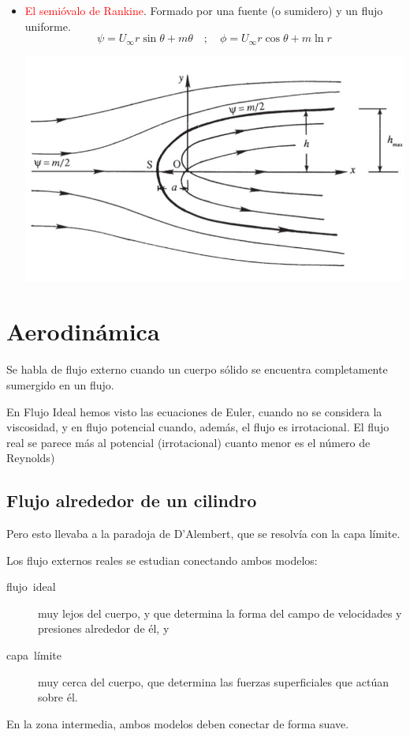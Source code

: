 \begin{itemize}
	
	 \item \textcolor{red}{El semióvalo de Rankine}. Formado por una fuente (o
	sumidero) y un flujo uniforme. 
	\[
	\psi=U_{\infty}r\sin\theta+m\theta\quad;\quad\phi=U_{\infty}r\cos\theta+m\ln r
	\]
	
\begin{center}
	\includegraphics[width=0.7\linewidth]{TeX_files/chapter09-Externo/rankine}
\end{center}

\end{itemize}

\section{Aerodinámica}

	
	Se habla de flujo externo cuando un cuerpo sólido se encuentra completamente
	sumergido en un flujo.
	
	En Flujo Ideal hemos visto las ecuaciones de Euler, cuando no se considera
	la viscosidad, y en flujo potencial cuando, además, el flujo es irrotacional.
	El flujo real se parece más al potencial (irrotacional) cuanto menor
	es el número de Reynolds)
\subsection{Flujo alrededor de un cilindro}
	
	\begin{center}
	\end{center}
	

	
	Pero esto llevaba a la paradoja de D'Alembert, que se resolvía con
	la capa límite.
	
	Los flujo externos reales se estudian conectando ambos modelos: 
	\begin{description}
		\item [{flujo~ideal}] muy lejos del cuerpo, y que determina la forma del
		campo de velocidades y presiones alrededor de él, y 
		\item [{capa~límite}] muy cerca del cuerpo, que determina las fuerzas
		superficiales que actúan sobre él. 
	\end{description}
	En la zona intermedia, ambos modelos deben conectar de forma suave.
	
